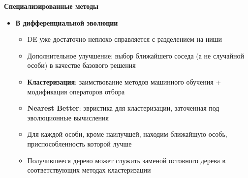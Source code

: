 \textbf{Специализированные методы}
\begin{itemize}
    \item \textbf{В дифференциальной эволюции}
    \begin{itemize}
        \item DE уже достаточно неплохо справляется с разделением на ниши
        \item Дополнительное улучшение: выбор ближайшего соседа (а не случайной особи) в качестве базового решения
        \item \textbf{Кластеризация}: заимствование методов машинного обучения + модификация операторов отбора
    \end{itemize}
    \begin{itemize}
        \item \textbf{Nearest Better}: эвристика для кластеризации, заточенная под эволюционные вычисления
        \item Для каждой особи, кроме наилучшей, находим ближайшую особь, приспособленность которой лучше
        \item Получившееся дерево может служить заменой остовного дерева в соответствующих методах кластеризации
    \end{itemize}
\end{itemize}